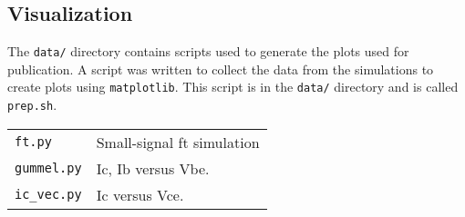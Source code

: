 \documentclass[11pt]{article}
\begin{document}
\subsection{Visualization}
The \texttt{data/} directory contains scripts used to generate the plots used for publication.  A script was written to collect the data from the simulations to create plots using \texttt{matplotlib}.  This script is in the \texttt{data/} directory and is called \texttt{prep.sh}.

\begin{tabular}{ll}
\texttt{ft.py} & Small-signal ft simulation\\
\texttt{gummel.py} & Ic, Ib versus Vbe.\\
\texttt{ic\_vec.py} & Ic versus Vce.\\
\end{tabular}
\end{document}
